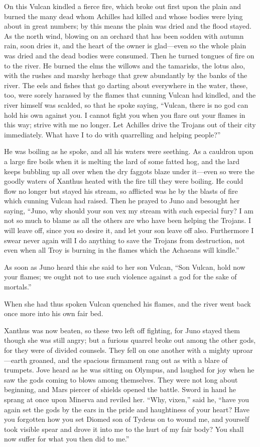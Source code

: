 On this Vulcan kindled a fierce fire, which broke out first upon the plain
and burned the many dead whom Achilles had killed and whose bodies were
lying about in great numbers; by this means the plain was dried and the
flood stayed. As the north wind, blowing on an orchard that has been
sodden with autumn rain, soon dries it, and the heart of the owner is glad—even
so the whole plain was dried and the dead bodies were consumed. Then he
turned tongues of fire on to the river. He burned the elms the willows and
the tamarisks, the lotus also, with the rushes and marshy herbage that
grew abundantly by the banks of the river. The eels and fishes that go
darting about everywhere in the water, these, too, were sorely harassed by
the flames that cunning Vulcan had kindled, and the river himself was
scalded, so that he spoke saying, “Vulcan, there is no god can hold his
own against you. I cannot fight you when you flare out your flames in this
way; strive with me no longer. Let Achilles drive the Trojans out of their
city immediately. What have I to do with quarrelling and helping people?”

He was boiling as he spoke, and all his waters were seething. As a
cauldron upon a large fire boils when it is melting the lard of some
fatted hog, and the lard keeps bubbling up all over when the dry faggots
blaze under it—even so were the goodly waters of Xanthus heated with
the fire till they were boiling. He could flow no longer but stayed his
stream, so afflicted was he by the blasts of fire which cunning Vulcan had
raised. Then he prayed to Juno and besought her saying, “Juno, why should
your son vex my stream with such especial fury? I am not so much to blame
as all the others are who have been helping the Trojans. I will leave off,
since you so desire it, and let your son leave off also. Furthermore I
swear never again will I do anything to save the Trojans from destruction,
not even when all Troy is burning in the flames which the Achaeans will
kindle.”

As soon as Juno heard this she said to her son Vulcan, “Son Vulcan, hold
now your flames; we ought not to use such violence against a god for the
sake of mortals.”

When she had thus spoken Vulcan quenched his flames, and the river went
back once more into his own fair bed.

Xanthus was now beaten, so these two left off fighting, for Juno stayed
them though she was still angry; but a furious quarrel broke out among the
other gods, for they were of divided counsels. They fell on one another
with a mighty uproar—earth groaned, and the spacious firmament rang
out as with a blare of trumpets. Jove heard as he was sitting on Olympus,
and laughed for joy when he saw the gods coming to blows among themselves.
They were not long about beginning, and Mars piercer of shields opened the
battle. Sword in hand he sprang at once upon Minerva and reviled her.
“Why, vixen,” said he, “have you again set the gods by the ears in the
pride and haughtiness of your heart? Have you forgotten how you set Diomed
son of Tydeus on to wound me, and yourself took visible spear and drove it
into me to the hurt of my fair body? You shall now suffer for what you
then did to me.”

